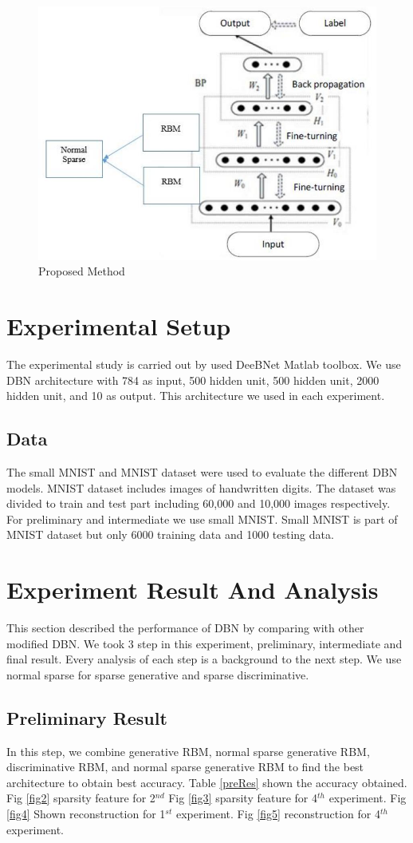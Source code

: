 \documentclass[conference]{IEEEtran}
\begin{document}
\begin{figure}[h]
	\centering
	\includegraphics[width=.25\textwidth]{pics/proposedMethod.jpg}
	\caption{Proposed Method}
	\label{fig1}
\end{figure}

\section{Experimental Setup}
The experimental study is carried out by used DeeBNet
Matlab toolbox\cite{keyvanrad3}. 
We use DBN architecture with 784 as input, 500 hidden
unit, 500 hidden unit, 2000 hidden unit, and 10 as output. This
architecture we used in each experiment.
\subsection{Data}
The small MNIST and MNIST dataset were used to evaluate the different DBN models. MNIST dataset includes images of handwritten digits\cite{lecun}. The dataset was divided to train and
test part including 60,000 and 10,000 images respectively. For preliminary and intermediate we use small MNIST. Small MNIST is part of MNIST dataset but only 6000 training data and 1000 testing data.
\section{Experiment Result And Analysis}
This section described the performance of DBN by
comparing with other modified DBN. We took 3 step in this
experiment, preliminary, intermediate and final result. Every
analysis of each step is a background to the next step. We use
normal sparse for sparse generative and sparse discriminative.
\subsection{Preliminary Result}
In this step, we combine generative RBM, normal sparse
generative RBM, discriminative RBM, and normal sparse
generative RBM to find the best architecture to obtain best
accuracy. Table \ref{preRes} shown the accuracy obtained. Fig \ref{fig2} sparsity feature for 2$^{nd}$ Fig \ref{fig3} sparsity feature for 4$^{th}$ experiment. Fig \ref{fig4} Shown reconstruction for 1$^{st}$ experiment. Fig \ref{fig5} reconstruction for
4$^{th}$ experiment.
\end{document}
